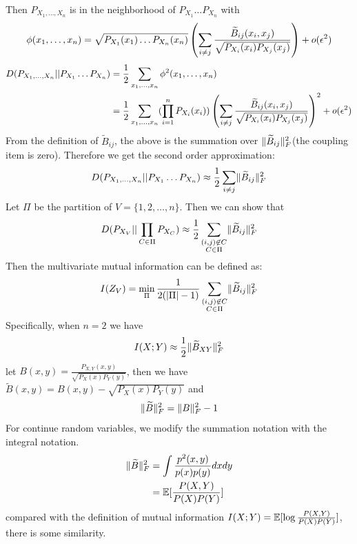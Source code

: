 \documentclass{article}
\begin{document}
Then $P_{X_1,\dots, X_n}$ is in the neighborhood of $P_{X_1}\dots P_{X_n}$ with $$\phi(x_1,\dots, x_n)=
\sqrt{P_{X_1}(x_1)\dots P_{X_n}(x_n)}\left(\sum_{i\neq j}{\widetilde{B}_{ij}(x_i, x_j) \over \sqrt{P_{X_i}(x_i)P_{X_j}(x_j)} }\right)+o(\epsilon^2)$$
\begin{align*}
D(P_{X_1,\dots, X_n}|| P_{X_1}\dots P_{X_n}) & ={1 \over 2} \sum_{x_1,\dots,x_n}\phi^2(x_1,\dots, x_n) \\
& = {1\over 2}\sum_{x_1,\dots,x_n} (\prod_{i=1}^n  P_{X_i} (x_i)) \left(\sum_{i\neq j}{\widetilde{B}_{ij}(x_i, x_j) \over \sqrt{P_{X_i}(x_i)P_{X_j}(x_j)} }\right)^2 +o(\epsilon^2) 
\end{align*}
From the definition of $\widetilde{B}_{ij}$, the above is the summation over $\lVert\widetilde{B}_{ij}\rVert^2_F$(the coupling item is zero). Therefore we get the second order approximation:
\begin{equation}
D(P_{X_1,\dots, X_n}|| P_{X_1}\dots P_{X_n}) \approx  {1 \over 2} \sum_{i\neq j} \lVert\widetilde{B}_{ij}\rVert^2_F 
\end{equation}
Let $\Pi$ be the partition of $V=\{1,2,\dots, n\}$. Then we can show that 
\begin{equation}
D(P_{X_V} || \prod_{C\in \Pi} P_{X_{C}}) \approx {1 \over 2}\sum_{\substack{(i,j) \not\in C\\ C\in \Pi}} \lVert\widetilde{B}_{ij}\rVert_F^2
\end{equation}
Then the multivariate mutual information can be defined as:
\begin{equation}
I(Z_V) = \min_{\Pi} {1 \over 2( \lvert\Pi\rvert - 1) } \sum_{\substack{(i,j) \not\in C\\ C\in \Pi}} \lVert\widetilde{B}_{ij}\rVert_F^2
\end{equation}
Specifically, when $n=2$ we have 
\begin{equation}
I(X;Y) \approx {1 \over 2} \lVert\widetilde{B}_{XY}\rVert_F^2
\end{equation}
let $B(x,y)=\frac{P_{X,Y}(x,y)}{\sqrt{P_X(x)P_Y(y)}}$, then we have $\widetilde{B}(x,y)=B(x,y)-\sqrt{P_X(x)P_Y(y)}$ and 
\begin{equation}
\lVert\widetilde{B}\rVert_F^2 = \lVert B\rVert_F^2 -1
\end{equation}
For continue random variables, we modify the summation notation with the integral notation.
\begin{align}
\lVert\widetilde{B}\rVert_F^2 & = \int \frac{p^2(x,y)}{p(x)p(y)} dx dy \\
& = \operatorname{\mathbb{E}}[\frac{P(X,Y)}{P(X)P(Y)}]
\end{align}
compared with the definition of mutual information $I(X;Y) =  \operatorname{\mathbb{E}}[\log \frac{P(X,Y)}{P(X)P(Y)}] $,
there is some similarity.
\end{document}
